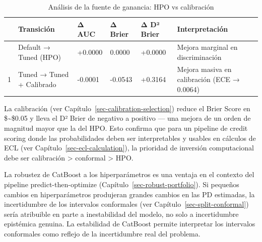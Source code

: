 \documentclass[
  spanish,
  11pt,
  letterpaper,
]{scrbook}
\theoremstyle{plain}
\theoremstyle{remark}
\begin{document}
{

\begin{longtable}[]{@{}llllll@{}}

\caption{\label{tbl-gain-analysis}Análisis de la fuente de ganancia: HPO
vs calibración}

\tabularnewline

\toprule\noalign{}
& Transición & Δ AUC & Δ Brier & Δ D² Brier & Interpretación \\
\midrule\noalign{}
\endhead
\bottomrule\noalign{}
\endlastfoot
0 & Default → Tuned (HPO) & +0.0000 & 0.0000 & +0.0000 & Mejora marginal
en discriminación \\
1 & Tuned → Tuned + Calibrado & -0.0001 & -0.0543 & +0.3164 & Mejora
masiva en calibración (ECE → 0.0064) \\

\end{longtable}

}

La calibración (ver Capítulo~\ref{sec-calibration-selection}) reduce el
Brier Score en \$\sim\$0.05 y lleva el D² Brier de negativo a positivo
--- una mejora de un orden de magnitud mayor que la del HPO. Esto
confirma que para un pipeline de credit scoring donde las probabilidades
deben ser interpretables y usables en cálculos de ECL (ver
Capítulo~\ref{sec-ecl-calculation}), la prioridad de inversión
computacional debe ser calibración \textgreater{} conformal
\textgreater{} HPO.

\begin{tcolorbox}[enhanced jigsaw, arc=.35mm, bottomrule=.15mm, bottomtitle=1mm, breakable, colback=white, colbacktitle=quarto-callout-note-color!10!white, colframe=quarto-callout-note-color-frame, coltitle=black, left=2mm, leftrule=.75mm, opacityback=0, opacitybacktitle=0.6, rightrule=.15mm, title=\textcolor{quarto-callout-note-color}{\faInfo}\hspace{0.5em}{Implicación para el pipeline predict-then-optimize}, titlerule=0mm, toprule=.15mm, toptitle=1mm]

La robustez de CatBoost a los hiperparámetros es una ventaja en el
contexto del pipeline predict-then-optimize
(Capítulo~\ref{sec-robust-portfolio}). Si pequeños cambios en
hiperparámetros produjeran grandes cambios en las PD estimadas, la
incertidumbre de los intervalos conformales (ver
Capítulo~\ref{sec-split-conformal}) sería atribuible en parte a
inestabilidad del modelo, no solo a incertidumbre epistémica genuina. La
estabilidad de CatBoost permite interpretar los intervalos conformales
como reflejo de la incertidumbre real del problema.

\end{tcolorbox}
\end{document}
